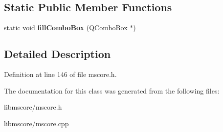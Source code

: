 \subsection*{Static Public Member Functions}
\begin{DoxyCompactItemize}
\item 
\mbox{\label{class_ms_1_1_direction_a98a9ea127e318d8a6b95b78f532962ff}} 
static void {\bfseries fill\+Combo\+Box} (Q\+Combo\+Box $\ast$)
\end{DoxyCompactItemize}


\subsection{Detailed Description}


Definition at line 146 of file mscore.\+h.



The documentation for this class was generated from the following files\+:\begin{DoxyCompactItemize}
\item 
libmscore/mscore.\+h\item 
libmscore/mscore.\+cpp\end{DoxyCompactItemize}
